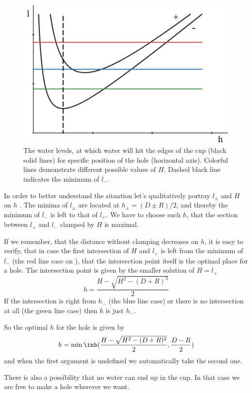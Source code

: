 \begin{figure}
    \centering
    \vspace{-.5cm}
    \includegraphics[width = .5\textwidth]{S-1}
    \caption{The water levels,
        at which water will hit the edges of the cup (black solid lines)
        for specific position of the hole (horizontal axis).
        Colorful lines demonstrate different possible values of $H$.
        Dashed black line indicates the minimum of $l_-$.}
    \vspace{-.5cm}
\end{figure}
In order to better understand the situation
let's qualitatively portray $l_\pm$ and $H$ on $h$ .
The minima of $l_\pm$ are located at $h_\pm = (D \pm R) / 2$,
and thereby the minimum of $l_-$ is left to that of $l_+$.
We have to choose such $h$,
that the section between $l_+$ and $l_-$ clamped by $H$ is maximal.

If we remember, that the distance without clamping decreases on $h$,
it is easy to verify, that
in case the first intersection of $H$ and $l_+$
is left from the minimum of $l_-$ (the red line case on ),
that the intersection point itself is the optimal place for a hole.
The intersection point is given by the smaller solution of $H = l_+$
\begin{equation}
    h = \frac{H - \sqrt{H^2 - (D + R)^2}}{2}
\end{equation}
If the intersection is right from $h_-$ (the blue line case)
or there is no intersection at all (the green line case)
then $h$ is just $h_-$.

So the optimal $h$ for the hole is given by
\begin{equation}
    h = \min\inb({\frac{H - \sqrt{H^2 - (D + R)^2}}{2}, \frac{D-R}{2}})
\end{equation}
and when the first argument is undefined we automatically take the second one.

There is also a possibility that no water can end up in the cup.
In that case we are free to make a hole wherever we want.
